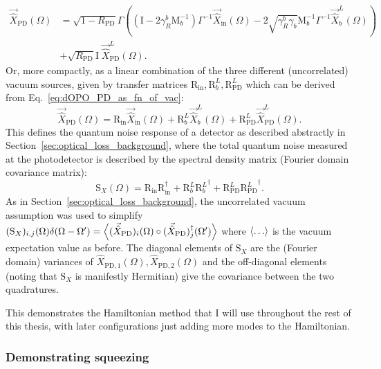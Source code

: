 \begin{align}
\label{eq:dOPO_PD_as_fn_of_vac}
\vec{\hat X}_\mathrm{PD}(\Omega)&=\sqrt{1-R_\text{PD}}\Gamma\left(\left(\text{I}-2\gamma^b_R\text{M}_b^{-1}\right)\Gamma^{-1}\vec{\hat X}_\mathrm{in}(\Omega)-2\sqrt{\gamma^b_R \gamma_b}\text{M}_b^{-1}\Gamma^{-1}\vec{\hat X}^L_b(\Omega)\right)\\
&+\sqrt{R_\text{PD}}\text{I}\;\vec{\hat X}^L_\text{PD}(\Omega).\nonumber
\end{align}
Or, more compactly, as a linear combination of the three different (uncorrelated) vacuum sources, given by transfer matrices $\text{R}_\text{in},\text{R}^L_b, \text{R}^L_\text{PD}$ which can be derived from Eq.~\ref{eq:dOPO_PD_as_fn_of_vac}: $$\vec{\hat X}_\mathrm{PD}(\Omega)=\text{R}_\text{in}\vec{\hat X}_\mathrm{in}(\Omega)+\text{R}^L_b\vec{\hat X}^L_b(\Omega)+\text{R}^L_\text{PD}\vec{\hat X}^L_\text{PD}(\Omega).$$ This defines the quantum noise response of a detector as described abstractly in Section~\ref{sec:optical_loss_background}, where the total quantum noise measured at the photodetector is described by the spectral density matrix (Fourier domain covariance matrix): $$\label{eq:dOPO_Sx_abstract}\text{S}_X(\Omega)=\text{R}_\text{in} \text{R}_\text{in}^\dag+\text{R}^L_b {\text{R}^L_b}^\dag+\text{R}^L_\text{PD}{\text{R}^L_\text{PD}}^\dag.$$ As in Section~\ref{sec:optical_loss_background}, the uncorrelated vacuum assumption was used to simplify $(\text{S}_X)_{i,j}(\Omega)\delta(\Omega-\Omega')=\ev{(\vec{\hat X}_\text{PD})_i(\Omega)\circ(\vec{\hat X}_\text{PD})_j^\dag(\Omega')}$ where $\ev{\ldots}$ is the vacuum expectation value as before. The diagonal elements of $\text{S}_X$ are the (Fourier domain) variances of ${\hat X}_{\mathrm{PD},1}(\Omega), {\hat X}_{\mathrm{PD},2}(\Omega)$ and the off-diagonal elements (noting that $\text{S}_X$ is manifestly Hermitian) give the covariance between the two quadratures.

This demonstrates the Hamiltonian method that I will use throughout the rest of this thesis, with later configurations just adding more modes to the Hamiltonian. %

\subsubsection{Demonstrating squeezing}

